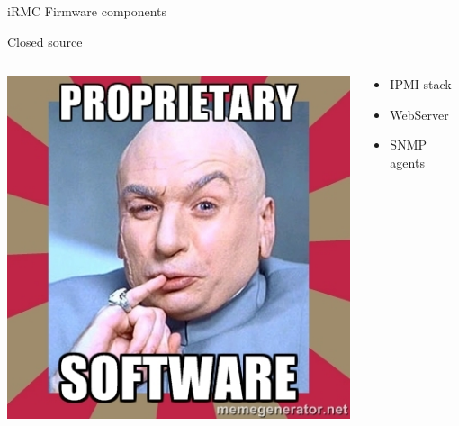 \documentclass{beamer}
\begin{document}
\begin{frame}{iRMC Firmware components}
\begin{block}{Closed source}
		\begin{columns}[onlytextwidth]
			\begin{column}{0.3\textwidth}
				\begin{center}
					\includegraphics[width=\textwidth]{logo/proprietary-software.jpg}
				\end{center}
			\end{column}
			\begin{column}{0.6\textwidth}
				\begin{itemize}
					\item IPMI stack
					\item WebServer 
					\item SNMP agents
				\end{itemize}
			\end{column}
		\end{columns}
	  \end{block}
  \end{frame}
\end{document}
